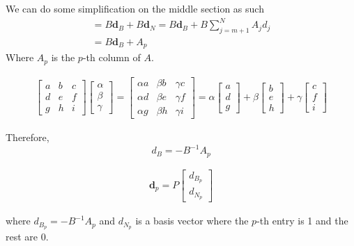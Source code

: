 We can do some simplification on the middle section as such
\begin{gather}
  = B \textbf{d}_B + B \textbf{d}_N = B \textbf{d}_B + B \sum_{j=m+1}^N A_j d_j \\
  = B \textbf{d}_B + A_p
\end{gather}
Where $A_p$ is the $p$-th column of $A$.

\begin{align}
  \begin{bmatrix}
     a & b & c \\
     d & e & f \\
     g & h & i
  \end{bmatrix}
  \begin{bmatrix}
    \alpha \\
    \beta \\
    \gamma
  \end{bmatrix}
  =
  \begin{bmatrix}
    \alpha a & \beta b & \gamma c \\
    \alpha d & \beta e & \gamma f \\
    \alpha g & \beta h & \gamma i
 \end{bmatrix}
 = \alpha
 \begin{bmatrix}
  a \\
  d \\
  g
 \end{bmatrix}
 + \beta
 \begin{bmatrix}
  b \\
  e \\
  h
 \end{bmatrix}
 + \gamma
 \begin{bmatrix}
  c \\
  f \\
  i
 \end{bmatrix}
\end{align}

Therefore, 
\begin{equation}
  d_B = -B^{-1} A_p
\end{equation}

\begin{align}
  \textbf{d}_p = P
  \begin{bmatrix}
    d_{B_p} \\
    d_{N_p}
  \end{bmatrix}
\end{align}

where $ d_{B_p} = -B^{-1} A_p$ and  $d_{N_p}$ is a basis vector where the $p$-th entry is 1 and the rest are 0.


